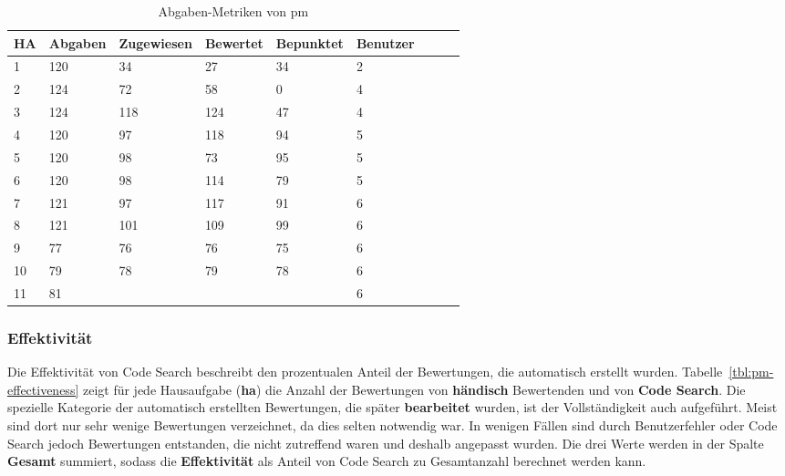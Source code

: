 \begin{table}
    \centering
    \caption{Abgaben-Metriken von \ac{pm}}
    \begin{tabular}{|l|l|l|l|l|l|l|l|l|}
    \hline
        HA & Abgaben & Zugewiesen & Bewertet & Bepunktet & Benutzer \\ \hline
        1  & 120 &  34 &  27 & 34 & 2  \\ \hline
        2  & 124 &  72 &  58 &  0 & 4  \\ \hline
        3  & 124 & 118 & 124 & 47 & 4  \\ \hline
        4  & 120 &  97 & 118 & 94 & 5  \\ \hline
        5  & 120 &  98 &  73 & 95 & 5  \\ \hline
        6  & 120 &  98 & 114 & 79 & 5  \\ \hline
        7  & 121 &  97 & 117 & 91 & 6  \\ \hline
        8  & 121 & 101 & 109 & 99 & 6  \\ \hline
        9  &  77 &  76 &  76 & 75 & 6  \\ \hline
        10 &  79 &  78 &  79 & 78 & 6  \\ \hline
        11 &  81 & \multicolumn{3}{c}{\todo{}} & 6 \\ \hline
    \end{tabular}
    \label{tbl:pm-solutions}
\end{table}

\subsubsection{Effektivität}

Die Effektivität von Code Search beschreibt den prozentualen Anteil der Bewertungen, die automatisch erstellt wurden.
Tabelle~\ref{tbl:pm-effectiveness} zeigt für jede Hausaufgabe (\textbf{\acs{ha}}) die Anzahl der Bewertungen von \textbf{händisch} Bewertenden und von \textbf{Code Search}.
Die spezielle Kategorie der automatisch erstellten Bewertungen, die später \textbf{bearbeitet} wurden, ist der Vollständigkeit auch aufgeführt.
Meist sind dort nur sehr wenige Bewertungen verzeichnet, da dies selten notwendig war.
In wenigen Fällen sind durch Benutzerfehler oder Code Search jedoch Bewertungen entstanden, die nicht zutreffend waren und deshalb angepasst wurden.
Die drei Werte werden in der Spalte \textbf{Gesamt} summiert, sodass die \textbf{Effektivität} als Anteil von Code Search zu Gesamtanzahl berechnet werden kann.

